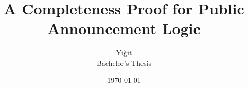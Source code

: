 \documentclass[11pt,a4paper,oneside]{report}
\title{A Completeness Proof for Public Announcement Logic}
\author{Yiğit \\ Bachelor's Thesis}
\date{\today}
\begin{document}
\maketitle
\begin{abstract}
\end{abstract}
\tableofcontents







\printbibliography
\appendix

\end{document}

